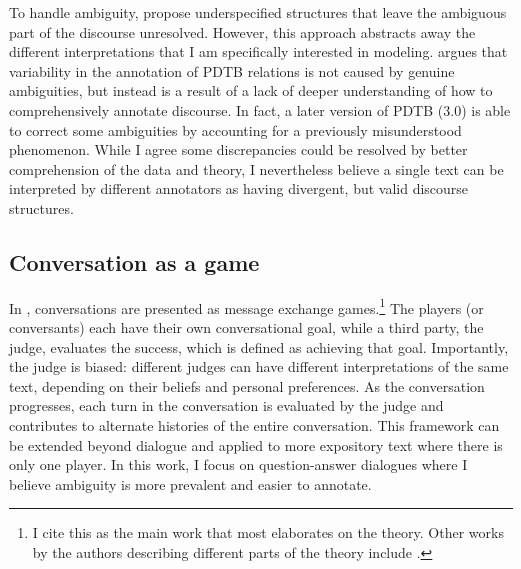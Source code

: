 To handle ambiguity, \citet{Hanneforth:2003} propose underspecified structures that leave the ambiguous part of the discourse unresolved. However, this approach abstracts away the different interpretations that I am specifically interested in modeling. \citet{Webber:2012} argues that variability in the annotation of PDTB relations is not caused by genuine ambiguities, but instead is a result of a lack of deeper understanding of how to comprehensively annotate discourse. In fact, a later version of PDTB (3.0) is able to correct some ambiguities by accounting for a previously misunderstood phenomenon. While I agree some discrepancies could be resolved by better comprehension of the data and theory, I nevertheless believe a single text can be interpreted by different annotators as having divergent, but valid discourse structures. 

\subsection{Conversation as a game} In \citet{Asher:2018}, conversations are presented as message exchange games.\footnote{I cite this as the main work that most elaborates on the theory. Other works by the authors describing different parts of the theory include \citet{Asher:2016,Asher:2017}.} The players (or conversants) each have their own conversational goal, while a third party, the judge, evaluates the success, which is defined as achieving that goal. Importantly, the judge is biased: different judges can have different interpretations of the same text, depending on their beliefs and personal preferences. As the conversation progresses, each turn in the conversation is evaluated by the judge and contributes to alternate histories of the entire conversation. This framework can be extended beyond dialogue and applied to more expository text where there is only one player. In this work, I focus on question-answer dialogues where I believe ambiguity is more prevalent and easier to annotate. 

